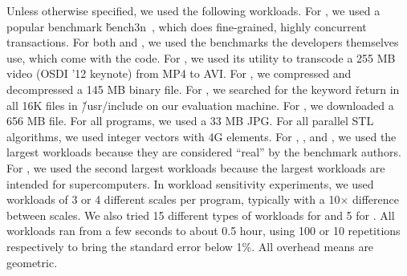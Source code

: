 


Unless otherwise specified, we used the following workloads.  For \bdb, we
used a popular benchmark \v{bench3n}~\cite{benchthreen}, which does
fine-grained, highly concurrent transactions. For both \openldap and
\redis, we used the benchmarks the developers themselves use, which come
with the code. For \mplayer, we used its utility \mencoder to transcode a
255 MB video (OSDI '12 keynote) from MP4 to AVI.  For \pbzip, we
compressed and decompressed a 145 MB binary file.  For \pfscan, we searched for
the keyword \v{return} in all 16K files in \v{/usr/include} on our
evaluation machine.  For \aget, we downloaded a 656 MB file. For all
\imagick programs, we used a 33 MB JPG.  For all \nstl
parallel STL algorithms, we used integer vectors with 4G elements.  For
\parsec, \splashx, and \phoenix, we used the largest workloads
because they are considered ``real'' by the benchmark authors.  For \npb, we
used the second largest workloads because the largest workloads are intended for
supercomputers. In workload sensitivity experiments, we used workloads of
3 or 4 different scales per program, typically with a 10$\times$ difference between
scales.  We also tried 15 different
types of workloads for \redis and 5 for \mplayer.  All workloads ran from
a few seconds to about 0.5 hour, using 100 or 10
repetitions respectively to bring the standard error below 1\%.
All overhead means are geometric.


